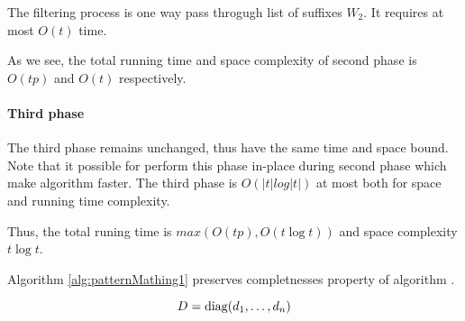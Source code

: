 The filtering process is one way pass throgugh list of suffixes $W_2$.
It requires at most $O(t)$ time.

As we see, the total running time and space complexity of second phase is $O(tp)$ and $O(t)$ respectively.

\paragraph{Third phase}
The third phase remains unchanged, thus have the  same time and space bound.
Note that it possible for perform this phase in-place during second phase which 
make algorithm faster.
The third phase is $O(|t| log|t|)$  at most both for space and running time complexity.

Thus, the total runing time is $max(O(tp),O(t \log t))$ and space complexity $t \log t$. 


\begin{theorem}
Algorithm \ref{alg:patternMathing1} preserves completnesses property of algorithm \cite{luciv2019interactive}.

\begin{displaymath}
    D = \operatorname{diag}(d_1,\dots,d_n)
  \end{displaymath}
\end{theorem}
